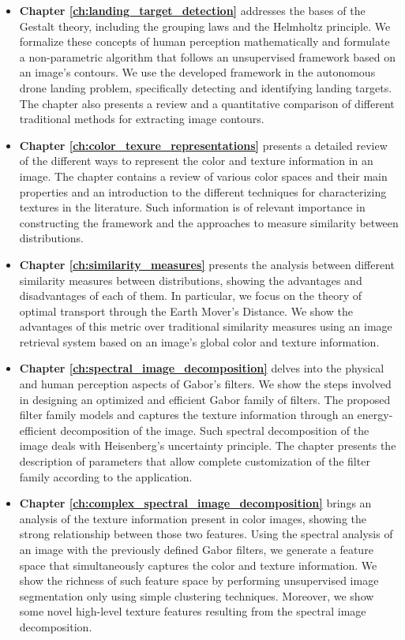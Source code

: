 \begin{itemize}
	\item \textbf{Chapter \ref{ch:landing_target_detection}} addresses the bases of the Gestalt theory, including the grouping laws and the Helmholtz principle. We formalize these concepts of human perception mathematically and formulate a non-parametric algorithm that follows an unsupervised framework based on an image's contours. We use the developed framework in the autonomous drone landing problem, specifically detecting and identifying landing targets.  The chapter also presents a review and a quantitative comparison of different traditional methods for extracting image contours.
	
	\item \textbf{Chapter \ref{ch:color_texure_representations}} presents a detailed review of the different ways to represent the color and texture information in an image. The chapter contains a review of various color spaces and their main properties and an introduction to the different techniques for characterizing textures in the literature. Such information is of relevant importance in constructing the framework and the approaches to measure similarity between distributions.
	
	\item \textbf{Chapter \ref{ch:similarity_measures}} presents the analysis between different similarity measures between distributions, showing the advantages and disadvantages of each of them. In particular, we focus on the theory of optimal transport through the Earth Mover's Distance. We show the advantages of this metric over traditional similarity measures using an image retrieval system based on an image's global color and texture information.
	
	\item \textbf{Chapter \ref{ch:spectral_image_decomposition}} delves into the physical and human perception aspects of Gabor's filters. We show the steps involved in designing an optimized and efficient Gabor family of filters. The proposed filter family models and captures the texture information through an energy-efficient decomposition of the image. Such spectral decomposition of the image deals with Heisenberg's uncertainty principle. The chapter presents the description of parameters that allow complete customization of the filter family according to the application.
	
	\item \textbf{Chapter \ref{ch:complex_spectral_image_decomposition}} brings an analysis of the texture information present in color images, showing the strong relationship between those two features. Using the spectral analysis of an image with the previously defined Gabor filters, we generate a feature space that simultaneously captures the color and texture information. We show the richness of such feature space by performing unsupervised image segmentation only using simple clustering techniques. Moreover, we show some novel high-level texture features resulting from the spectral image decomposition.
	

\end{itemize}
